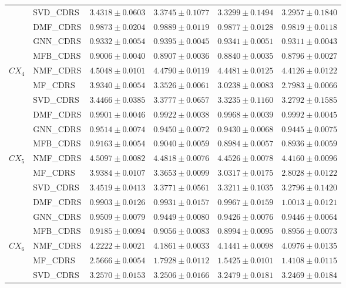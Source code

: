 \documentclass[pdflatex,sn-mathphys-num]{sn-jnl}%
\theoremstyle{thmstyleone}%
\theoremstyle{thmstyletwo}%
\theoremstyle{thmstylethree}%
\begin{document}
\begin{longtable}{llcccc}
 & SVD\_CDRS & $3.4318\pm0.0603$ & $3.3745\pm0.1077$ & $3.3299\pm0.1494$ & $3.2957\pm0.1840$ \\
 & DMF\_CDRS & $0.9873\pm0.0204$ & $0.9889\pm0.0119$ & $0.9877\pm0.0128$ & $0.9819\pm0.0118$ \\
 & GNN\_CDRS & $0.9332\pm0.0054$ & $0.9395\pm0.0045$ & $0.9341\pm0.0051$ & $0.9311\pm0.0043$ \\
 & MFB\_CDRS & $0.9006\pm0.0040$ & $0.8907\pm0.0036$ & $0.8840\pm0.0035$ & $0.8796\pm0.0027$ \\
\midrule
$CX_4$ & NMF\_CDRS & $4.5048\pm0.0101$ & $4.4790\pm0.0119$ & $4.4481\pm0.0125$ & $4.4126\pm0.0122$ \\
 & MF\_CDRS & $3.9340\pm0.0054$ & $3.3526\pm0.0061$ & $3.0238\pm0.0083$ & $2.7983\pm0.0066$ \\
 & SVD\_CDRS & $3.4466\pm0.0385$ & $3.3777\pm0.0657$ & $3.3235\pm0.1160$ & $3.2792\pm0.1585$ \\
 & DMF\_CDRS & $0.9901\pm0.0046$ & $0.9922\pm0.0038$ & $0.9968\pm0.0039$ & $0.9992\pm0.0045$ \\
 & GNN\_CDRS & $0.9514\pm0.0074$ & $0.9450\pm0.0072$ & $0.9430\pm0.0068$ & $0.9445\pm0.0075$ \\
 & MFB\_CDRS & $0.9163\pm0.0054$ & $0.9040\pm0.0059$ & $0.8984\pm0.0057$ & $0.8936\pm0.0059$ \\
\midrule
$CX_5$ & NMF\_CDRS & $4.5097\pm0.0082$ & $4.4818\pm0.0076$ & $4.4526\pm0.0078$ & $4.4160\pm0.0096$ \\
 & MF\_CDRS & $3.9384\pm0.0107$ & $3.3653\pm0.0099$ & $3.0317\pm0.0175$ & $2.8028\pm0.0122$ \\
 & SVD\_CDRS & $3.4519\pm0.0413$ & $3.3771\pm0.0561$ & $3.3211\pm0.1035$ & $3.2796\pm0.1420$ \\
 & DMF\_CDRS & $0.9903\pm0.0126$ & $0.9931\pm0.0157$ & $0.9967\pm0.0159$ & $1.0013\pm0.0121$ \\
 & GNN\_CDRS & $0.9509\pm0.0079$ & $0.9449\pm0.0080$ & $0.9426\pm0.0076$ & $0.9446\pm0.0064$ \\
 & MFB\_CDRS & $0.9185\pm0.0094$ & $0.9056\pm0.0083$ & $0.8994\pm0.0095$ & $0.8956\pm0.0073$ \\
\midrule
$CX_6$ & NMF\_CDRS & $4.2222\pm0.0021$ & $4.1861\pm0.0033$ & $4.1441\pm0.0098$ & $4.0976\pm0.0135$ \\
 & MF\_CDRS & $2.5666\pm0.0054$ & $1.7928\pm0.0112$ & $1.5425\pm0.0101$ & $1.4108\pm0.0115$ \\
 & SVD\_CDRS & $3.2570\pm0.0153$ & $3.2506\pm0.0166$ & $3.2479\pm0.0181$ & $3.2469\pm0.0184$ \\

\end{longtable}
\end{document}
